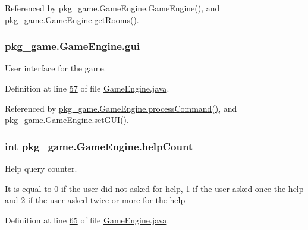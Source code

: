 Referenced by \hyperlink{GameEngine_8java_source_l00076}{pkg\-\_\-game.\-Game\-Engine.\-Game\-Engine()}, and \hyperlink{GameEngine_8java_source_l00306}{pkg\-\_\-game.\-Game\-Engine.\-get\-Rooms()}.

\hypertarget{classpkg__game_1_1GameEngine_a152cd31474cc8a5980e32c2cab6e7d36}{
\subsubsection[{gui}]{ pkg\-\_\-game.\-Game\-Engine.\-gui\hspace{0.3cm}{\ttfamily [private]}}}\label{classpkg__game_1_1GameEngine_a152cd31474cc8a5980e32c2cab6e7d36}


User interface for the game. 



Definition at line \hyperlink{GameEngine_8java_source_l00057}{57} of file \hyperlink{GameEngine_8java_source}{Game\-Engine.\-java}.



Referenced by \hyperlink{GameEngine_8java_source_l00238}{pkg\-\_\-game.\-Game\-Engine.\-process\-Command()}, and \hyperlink{GameEngine_8java_source_l00095}{pkg\-\_\-game.\-Game\-Engine.\-set\-G\-U\-I()}.

\hypertarget{classpkg__game_1_1GameEngine_a3229e823376625b5d9102d24d628a0fb}{
\subsubsection[{help\-Count}]{\setlength{\rightskip}{0pt plus 5cm}int pkg\-\_\-game.\-Game\-Engine.\-help\-Count\hspace{0.3cm}{\ttfamily [private]}}}\label{classpkg__game_1_1GameEngine_a3229e823376625b5d9102d24d628a0fb}


Help query counter. 

It is equal to 0 if the user did not asked for help, 1 if the user asked once the help and 2 if the user asked twice or more for the help 

Definition at line \hyperlink{GameEngine_8java_source_l00065}{65} of file \hyperlink{GameEngine_8java_source}{Game\-Engine.\-java}.



